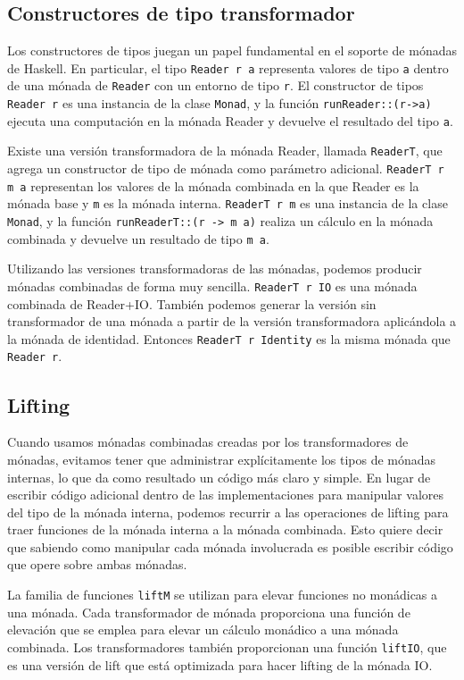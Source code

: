 \subsection{Constructores de tipo transformador}
Los constructores de tipos juegan un papel fundamental en el soporte de mónadas de Haskell. En particular, el tipo \texttt{Reader r a} representa  valores de tipo \texttt{a} dentro de una mónada de \texttt{Reader} con un entorno de tipo \texttt{r}. El constructor de tipos \texttt{Reader r} es una instancia de la clase \texttt{Monad}, y la función \texttt{runReader::(r->a)} ejecuta una computación en la mónada Reader y devuelve el resultado del tipo \texttt{a}.

Existe una versión transformadora de la mónada Reader, llamada \texttt{ReaderT}, que agrega un constructor de tipo de mónada como parámetro adicional. \texttt{ReaderT r m a} representan los valores de la mónada combinada en la que Reader es la mónada base y \texttt{m} es la mónada interna. \texttt{ReaderT r m} es una instancia de la clase \texttt{Monad}, y la función \texttt{runReaderT::(r -> m a)} realiza un cálculo en la mónada combinada y devuelve un resultado de tipo \texttt{m a}.

Utilizando las versiones transformadoras de las mónadas, podemos producir mónadas combinadas de forma muy sencilla. \texttt{ReaderT r IO} es una mónada combinada de Reader+IO. También podemos generar la versión sin transformador de una mónada a partir de la versión transformadora aplicándola a la mónada de identidad. Entonces \texttt{ReaderT r Identity} es la misma mónada que \texttt{Reader r}.

\subsection{Lifting}

Cuando usamos mónadas combinadas creadas por los transformadores de mónadas, evitamos tener que administrar explícitamente los tipos de mónadas internas, lo que da como resultado un código más claro y simple. En lugar de escribir código adicional dentro de las implementaciones para manipular valores del tipo de la mónada interna, podemos recurrir a las operaciones de lifting para traer funciones de la mónada interna a la mónada combinada. Esto quiere decir que sabiendo como manipular cada mónada involucrada es posible escribir código que opere sobre ambas mónadas.

La familia de funciones \texttt{liftM} se utilizan para elevar funciones no monádicas a una mónada. Cada transformador de mónada proporciona una función de elevación que se emplea para elevar un cálculo monádico a una mónada combinada. Los transformadores también proporcionan una función \texttt{liftIO}, que es una versión de lift que está optimizada para hacer lifting de la mónada IO.

